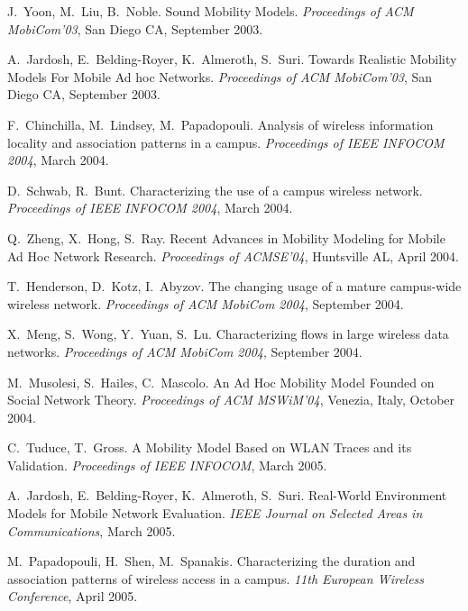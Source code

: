 \begin{thebibliography}{99}
J.~Yoon, M.~Liu, B.~Noble.
Sound Mobility Models.
\textit{Proceedings of ACM MobiCom'03}, San Diego CA, September 2003.

A.~Jardosh, E.~Belding-Royer, K.~Almeroth, S.~Suri.
Towards Realistic Mobility Models For Mobile Ad hoc Networks.
\textit{Proceedings of ACM MobiCom'03}, San Diego CA, September 2003.

F.~Chinchilla, M.~Lindsey, M.~Papadopouli.
Analysis of wireless information locality and association patterns in a campus.
\textit{Proceedings of IEEE INFOCOM 2004}, March 2004.

D.~Schwab, R.~Bunt.
Characterizing the use of a campus wireless network.
\textit{Proceedings of IEEE INFOCOM 2004}, March 2004.

Q.~Zheng, X.~Hong, S.~Ray.
Recent Advances in Mobility Modeling for Mobile Ad Hoc Network Research.
\textit{Proceedings of ACMSE’04}, Huntsville AL, April 2004.

T.~Henderson, D.~Kotz, I.~Abyzov.
The changing usage of a mature campus-wide wireless network.
\textit{Proceedings of ACM MobiCom 2004}, September 2004.

X.~Meng, S.~Wong, Y.~Yuan, S.~Lu.
Characterizing flows in large wireless data networks.
\textit{Proceedings of ACM MobiCom 2004}, September 2004.

M.~Musolesi, S.~Hailes, C.~Mascolo.
An Ad Hoc Mobility Model Founded on Social Network Theory.
\textit{Proceedings of ACM MSWiM’04}, Venezia, Italy, October 2004.

C.~Tuduce, T.~Gross.
A Mobility Model Based on WLAN Traces and its Validation.
\textit{Proceedings of IEEE INFOCOM}, March 2005.

A.~Jardosh, E.~Belding-Royer, K.~Almeroth, S.~Suri.
Real-World Environment Models for Mobile Network Evaluation.
\textit{IEEE Journal on Selected Areas in Communications}, March 2005.

M.~Papadopouli, H.~Shen, M.~Spanakis.
Characterizing the duration and association patterns of wireless access in a campus.
\textit{11th European Wireless Conference}, April 2005.

\end{thebibliography}
